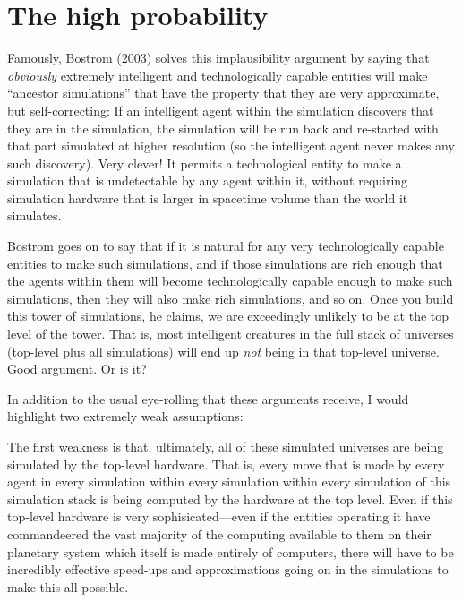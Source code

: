 \documentclass[12pt,letterpaper]{article}
\begin{document}
\section{The high probability}

Famously, Bostrom (2003) solves this implausibility argument by saying
that \emph{obviously} extremely intelligent and technologically
capable entities will make ``ancestor simulations'' that have the
property that they are very approximate, but self-correcting: If an
intelligent agent within the simulation discovers that they are in the
simulation, the simulation will be run back and re-started with that
part simulated at higher resolution (so the intelligent agent never
makes any such discovery). Very clever! It permits a technological entity
to make a simulation that is undetectable by any agent within it, without
requiring simulation hardware that is larger in spacetime volume than
the world it simulates.

Bostrom goes on to say that if it is natural for any very
technologically capable entities to make such simulations, and if
those simulations are rich enough that the agents within them will
become technologically capable enough to make such simulations, then
they will also make rich simulations, and so on. Once you build this
tower of simulations, he claims, we are exceedingly unlikely to be at
the top level of the tower.
That is, most intelligent creatures in the full stack
of universes (top-level plus all simulations) will end up \emph{not}
being in that top-level universe. Good argument. Or is it?

In addition to the usual eye-rolling that these arguments receive, I
would highlight two extremely weak assumptions:

The first weakness is that, ultimately, all of these simulated
universes are being simulated by the top-level hardware. That is,
every move that is made by every agent in every simulation within
every simulation within every simulation of this simulation stack is
being computed by the hardware at the top level. Even if this
top-level hardware is very sophisicated---even if the entities
operating it have commandeered the vast majority of the computing
available to them on their planetary system which itself is made
entirely of computers, there will have to be incredibly effective
speed-ups and approximations going on in the simulations to make this
all possible.
\end{document}
